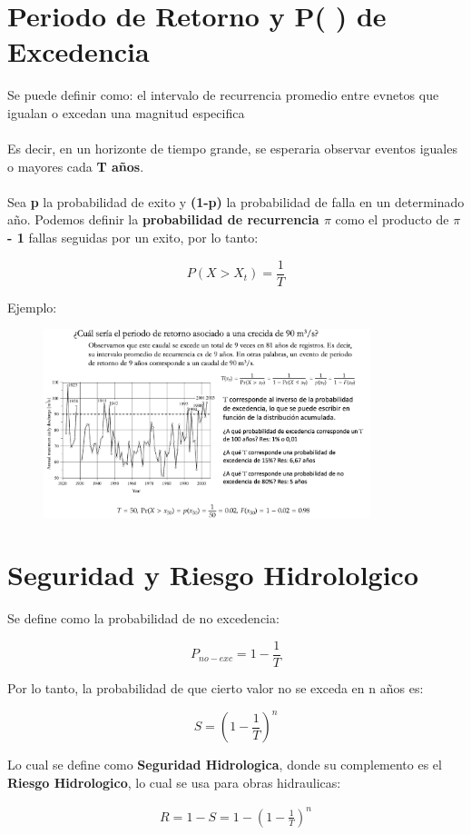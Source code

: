 \section{Periodo de Retorno y P( ) de Excedencia}

Se puede definir como: el intervalo de recurrencia promedio entre evnetos que igualan o excedan una magnitud especifica
\\ \\
Es decir, en un horizonte de tiempo grande, se esperaria observar eventos iguales o mayores cada \textbf{T años}.
\\ \\
Sea \textbf{p} la probabilidad de exito y \textbf{(1-p)} la probabilidad de falla en un determinado año. Podemos definir la \textbf{probabilidad de recurrencia $\pi$} como el producto de \textbf{$\pi$ - 1} fallas seguidas por un exito, por lo tanto:

\begin{equation}
    P(X > X_t) = \frac{1}{T}
\end{equation}

Ejemplo:

\begin{figure}[H]
    \centering
    \includegraphics[width=0.85\textwidth]{imagenes/retorno.png}
    \label{fig:periodo_retorno}
\end{figure}

\section{Seguridad y Riesgo Hidrololgico}

Se define como la probabilidad de no excedencia:

\begin{equation}
    P_{no-exc} = 1 - \frac{1}{T}
\end{equation}

Por lo tanto, la probabilidad de que cierto valor no se exceda en n años es:

\begin{equation}
    S = (1 - \frac{1}{T})^n 
\end{equation}

Lo cual se define como \textbf{Seguridad Hidrologica}, donde su complemento es el \textbf{Riesgo Hidrologico}, lo cual se usa para obras hidraulicas:

\begin{eqnarray}
    R = 1- S = 1 - (1 - \frac{1}{T})^n
\end{eqnarray}

